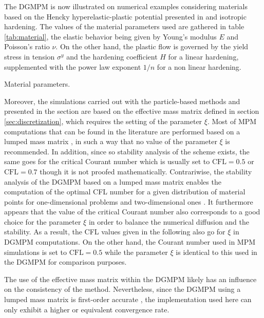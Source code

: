 The DGMPM is now illustrated on numerical examples considering materials based on the Hencky hyperelastic-plastic potential presented in \cite{Laurent2009} and isotropic hardening. 
The values of the material parameters used are gathered in table \ref{tab:material}, the elastic behavior being given by Young's modulus $E$ and Poisson's ratio $\nu$. 
On the other hand, the plastic flow is governed by the yield stress in tension $\sigma^y$ and the hardening coefficient $H$ for a linear hardening, supplemented with the power law exponent $1/n$ for a non linear hardening.
\begin{table}[h!]
  \centering
  
  \caption{Material parameters.}
  \label{tab:material}
\end{table}

Moreover, the simulations carried out with the particle-based methods and presented in the section are based on the effective mass matrix defined in section \ref{sec:discretization}, which requires the setting of the parameter $\xi$.
Most of MPM computations that can be found in the literature are performed based on a lumped mass matrix \cite{Sulsky94,Sulsky95,Silo_Wieckowski,Wieckowski,Sloshing_impact}, in such a way that no value of the parameter $\xi$ is recommended.
In addition, since so stability analysis of the scheme exists, the same goes for the critical Courant number which is usually set to $\text{CFL}=0.5$ or $\text{CFL}=0.7$ though it is not proofed mathematically.
Contrariwise, the stability analysis of the DGMPM based on a lumped mass matrix enables the computation of the optimal CFL number for a given distribution of material points for one-dimensional problems \cite{DGMPM} and two-dimensional ones \cite{DGMPM_stab}.
It furthermore appears that the value of the critical Courant number also corresponds to a good choice for the parameter $\xi$ in order to balance the numerical diffusion and the stability.
As a result, the CFL values given in the following also go for $\xi$ in DGMPM computations.
On the other hand, the Courant number used in MPM simulations is set to $\text{CFL}=0.5$ while the parameter $\xi$ is identical to this used in the DGMPM for comparison purposes. 

\begin{remark}
  The use of the effective mass matrix within the DGMPM likely has an influence on the consistency of the method.
  Nevertheless, since the DGMPM using a lumped mass matrix is first-order accurate \cite{Thesis}, the implementation used here can only exhibit a higher or equivalent convergence rate.
\end{remark}

